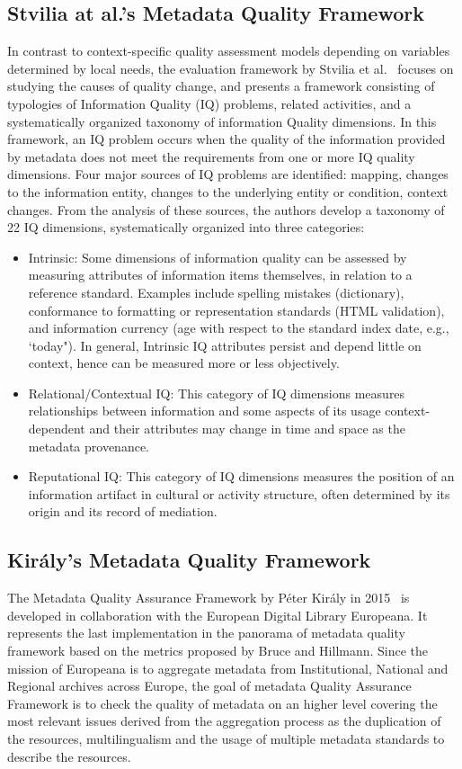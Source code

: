 \documentclass[epsfig,a4paper,12pt,titlepage]{book}
\begin{document}
\subsection{Stvilia at al.'s Metadata Quality Framework}
\label{sub:Stvilia}
In contrast to context-specific quality assessment models depending on variables determined by local needs, the evaluation framework by Stvilia et al.~\cite{20} focuses on studying the causes of quality change, and presents a framework consisting of typologies of Information Quality (IQ) problems, related activities, and a systematically organized taxonomy of information Quality dimensions. In this framework, an IQ problem occurs when the quality of the information provided by metadata does not meet the requirements from one or more IQ quality dimensions.
Four major sources of IQ problems are identified: mapping, changes to the information entity, changes to the underlying entity or condition, context changes. From the analysis of these sources, the authors develop a taxonomy of 22 IQ dimensions, systematically organized into three categories: 
\begin{itemize}
    \item Intrinsic: Some dimensions of information quality can be assessed by
measuring attributes of information items themselves, in relation to a
reference standard. Examples include spelling mistakes (dictionary), conformance to formatting or representation standards (HTML validation),
and information currency (age with respect to the standard index date, e.g.,
`today"). In general, Intrinsic IQ attributes persist and depend little on
context, hence can be measured more or less objectively.
\item Relational/Contextual IQ: This category of IQ dimensions measures relationships between information and some aspects of its usage context-dependent and their attributes may change in time and space as the metadata provenance.

\item Reputational IQ: This category of IQ dimensions measures the position
of an information artifact in cultural or activity structure, often determined by its origin and its record of mediation.
\end{itemize}


\subsection{Kir{\'a}ly's  Metadata Quality Framework}
\label{sub:Kiraly}
    The Metadata Quality Assurance Framework by P{\'e}ter Kir{\'a}ly in 2015~\cite{kiraly2015metadata} is developed in collaboration with the European Digital Library Europeana. It represents the last implementation in the panorama of metadata quality framework based on the metrics proposed by Bruce and Hillmann. Since the mission of Europeana is to aggregate metadata from Institutional, National and Regional archives across Europe, the goal of metadata Quality Assurance Framework is to check the quality of metadata on an higher level covering the most relevant issues derived from the aggregation process as the duplication of the resources, multilingualism and the usage of multiple metadata standards to describe the resources.
\end{document}

